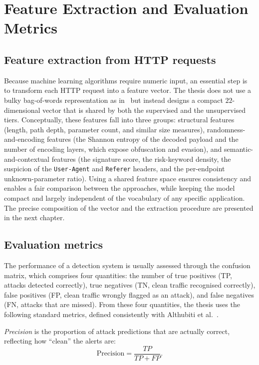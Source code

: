 \documentclass[../main.tex]{subfiles}
\begin{document}
\section{Feature Extraction and Evaluation Metrics}
\label{sec:features}

\subsection{Feature extraction from HTTP requests}

Because machine learning algorithms require numeric input, an essential
step is to transform each HTTP request into a feature vector. The thesis
does not use a bulky bag-of-words representation as in~\cite{pham2016} but
instead designs a compact $22$-dimensional vector that is shared by both
the supervised and the unsupervised tiers. Conceptually, these features
fall into three groups: structural features (length, path depth, parameter
count, and similar size measures), randomness-and-encoding features (the
Shannon entropy of the decoded payload and the number of encoding layers,
which expose obfuscation and evasion), and semantic-and-contextual features
(the signature score, the risk-keyword density, the suspicion of the
\texttt{User-Agent} and \texttt{Referer} headers, and the per-endpoint
unknown-parameter ratio). Using a shared feature space ensures consistency
and enables a fair comparison between the approaches, while keeping the
model compact and largely independent of the vocabulary of any specific
application. The precise composition of the vector and the extraction
procedure are presented in the next chapter.

\subsection{Evaluation metrics}

The performance of a detection system is usually assessed through the
confusion matrix, which comprises four quantities: the number of true
positives (TP, attacks detected correctly), true negatives (TN, clean
traffic recognised correctly), false positives (FP, clean traffic wrongly
flagged as an attack), and false negatives (FN, attacks that are missed).
From these four quantities, the thesis uses the following standard metrics,
defined consistently with Althubiti et al.~\cite{althubiti2017}.

\emph{Precision} is the proportion of attack predictions that are actually
correct, reflecting how ``clean'' the alerts are:
\begin{equation}
  \text{Precision} = \frac{TP}{TP + FP}.
  \label{eq:precision}
\end{equation}
\end{document}
